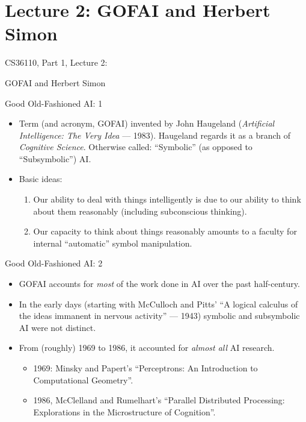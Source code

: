 \documentclass{article}
\begin{document}
\section{Lecture 2: GOFAI and Herbert Simon}

\begin{slide}{}
{\Large CS36110, Part 1, Lecture 2:}

{\Large GOFAI and Herbert Simon}

\end{slide}

\begin{slide}{}
{\Large Good Old-Fashioned AI: 1}
\begin{itemize}
\item Term (and acronym, GOFAI) invented by John Haugeland ({\em Artificial
Intelligence: The Very Idea} --- 1983). Haugeland regards it as a
branch of {\em Cognitive Science}. Otherwise called: ``Symbolic''
(as opposed to ``Subsymbolic'') AI.
\item Basic ideas:
\begin{enumerate}
\item Our ability to deal with things intelligently is due to our
ability to think about them reasonably (including subconscious thinking).
\item Our capacity to think about things reasonably amounts to a
faculty for internal ``automatic'' symbol manipulation.
\end{enumerate}
\end{itemize}
\end{slide}

\begin{slide}{}
{\Large Good Old-Fashioned AI: 2}
\begin{itemize}
\item GOFAI accounts for {\em most} of the work done in AI over the past
half-century.
\item In the early days (starting with McCulloch and Pitts' ``A
logical calculus of the ideas immanent in nervous activity'' --- 1943)
symbolic and subsymbolic AI were not distinct.
\item From (roughly) 1969 to 1986, it accounted for {\em almost all}
AI research.
\begin{itemize}
\item 1969: Minsky and Papert's ``Perceptrons: An
Introduction to Computational Geometry''.
\item 1986,
McClelland and Rumelhart's ``Parallel Distributed Processing:
Explorations in the Microstructure of Cognition''.
\end{itemize}
\end{itemize}
\end{slide}
\end{document}

